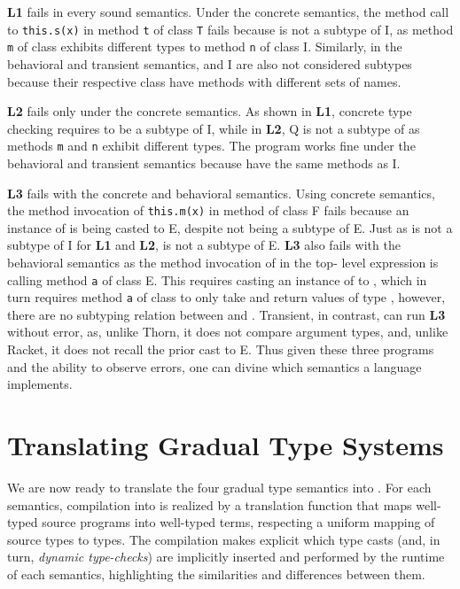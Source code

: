 \documentclass[runnningheads]{tex/llncs}
\begin{document}
{\bf L1} fails in every sound semantics. Under the concrete semantics, the
method call to {\tt this.s(x)} in method {\tt t} of class {\tt T} fails
because \A is not a subtype of \xt I, as method {\tt m} of class \A exhibits
different types to method {\tt n} of class \xt I. Similarly, in the behavioral
and transient semantics, \A and \xt I are also not considered subtypes because
their respective class have methods with different sets of names.

{\bf L2} fails only under the concrete semantics. As shown in {\bf L1},
concrete type checking requires \A to be a subtype of \xt I, while in {\bf
	L2}, \xt Q is not a subtype of \A as methods {\tt m} and {\tt n} exhibit
different types. The program works fine under the behavioral and transient
semantics because \A have the same methods as \xt I.

{\bf L3} fails with the concrete and behavioral semantics. Using concrete
semantics, the method invocation of {\tt this.m(x)} in method \n of class \xt
F fails because an instance of \C is being casted to \xt E, despite \C not
being a subtype of \xt E.  Just as \A is not a subtype of \xt I for {\bf L1}
and {\bf L2}, \C is not a subtype of \xt E. {\bf L3} also fails with the
behavioral semantics as the method invocation of  in the top-
level expression is calling method \texttt{a} of class \xt E. This requires
casting an instance of \C to \D, which in turn requires method \texttt{a} of
class \C to only take and return values of type \D, however, there are no
subtyping relation between \C and \D. Transient, in contrast, can run {\bf L3}
without error, as, unlike Thorn, it does not compare argument types, and,
unlike Racket, it does not recall the prior cast to \xt E. Thus given these
three programs and the ability to observe errors, one can divine which
semantics a language implements.

\section{Translating Gradual Type Systems}


\noindent
We are now ready to translate the four gradual type semantics into \kafka.  
For each semantics, compilation into \kafka is realized by a translation function that maps
well-typed source programs into well-typed \kafka terms, respecting a
uniform mapping of source types to \kafka types.  The compilation makes
explicit which type casts (and, in turn, \emph{dynamic type-checks}) are
implicitly inserted and performed by the runtime of each semantics,
highlighting the similarities and differences between them.
\end{document}
